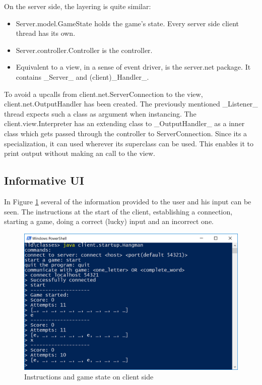 \documentclass[a4paper]{scrartcl}
\begin{document}
On the server side, the layering is quite similar:
\begin{itemize}
    \item Server.model.GameState holds the game's state. Every server side client thread has its own.
    \item Server.controller.Controller is the controller.
    \item Equivalent to a view, in a sense of event driver, is the server.net package.
    It contains _Server_ and (client)_Handler_.
\end{itemize}

To avoid a upcalls from client.net.ServerConnection to the view, client.net.OutputHandler has been created.
The previously mentioned _Listener_ thread expects such a class as argument when instancing.
The client.view.Interpreter has an extending class to _OutputHandler_ as a inner class which gets passed through the controller to ServerConnection.
Since its a specialization, it can used wherever its superclass can be used.
This enables it to print output without making an call to the view.

\subsection{Informative UI}
In Figure \ref{fig:ui} several of the information provided to the user and his input can be seen.
The instructions at the start of the client, establishing a connection, starting a game, doing a correct (lucky) input and an incorrect one.

\begin{figure}[h!]
  \begin{center}
    \includegraphics[scale=0.8]{ui.png}
    \caption{Instructions and game state on client side}
    \label{fig:ui}
  \end{center}
\end{figure}
\end{document}
